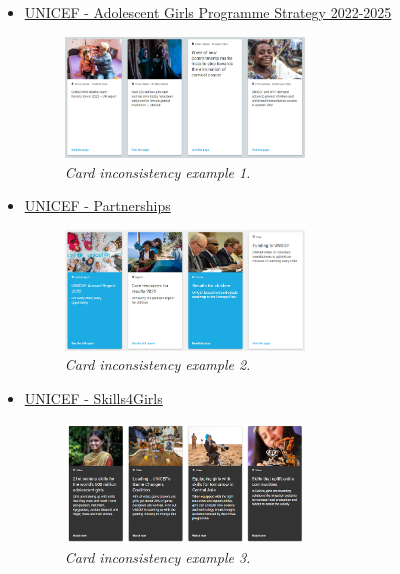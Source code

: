 \begin{itemize}
	\item \href{https://www.unicef.org/reports/adolescent-girls-programme-strategy-2022-2025}{UNICEF - Adolescent Girls Programme Strategy 2022-2025}
	\begin{figure}[h]
		\centering
		\begin{center}
			\includegraphics[width=0.6\textwidth]{Picture5.png}
		\end{center}
		\captionsetup{font=small}
		\caption{\textit{Card inconsistency example 1.}}
		\label{fig:label5}
	\end{figure}
	\item \href{https://www.unicef.org/partnerships/public}{UNICEF - Partnerships}
	\begin{figure}[h]
		\centering
		\begin{center}
			\includegraphics[width=0.6\textwidth]{Picture6.png}
		\end{center}
		\captionsetup{font=small}
		\caption{\textit{Card inconsistency example 2.}}
		\label{fig:label6}
	\end{figure}
	\item \href{https://www.unicef.org/gender-equality/skills4girls}{UNICEF - Skills4Girls}
	\begin{figure}[h]
		\centering
		\begin{center}
			\includegraphics[width=0.6\textwidth]{Picture7.png}
		\end{center}
		\captionsetup{font=small}
		\caption{\textit{Card inconsistency example 3.}}
		\label{fig:label7}
	\end{figure}
\end{itemize}

